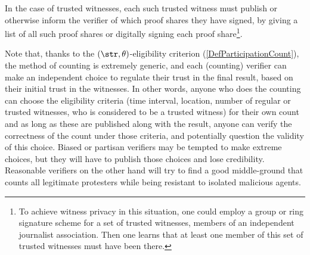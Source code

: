 

In the case of trusted witnesses, each such trusted witness must
publish or otherwise inform the verifier of which proof shares they
have signed, \eg by giving a list of all such proof shares or
digitally signing each proof share\footnote{%
  To achieve witness privacy in this situation, one could employ a
  group or ring signature scheme for a set of trusted witnesses, \eg
  members of an independent journalist association.  Then one learns
  that at least one member of this set of trusted witnesses must have
  been there.  }.

Note that, thanks to the \((\str,\theta)\)-eligibility criterion
(\cref{DefParticipationCount}), the method of counting is extremely
generic, and each (counting) verifier can make an independent choice to regulate their trust in the final result, based on their initial trust in the witnesses. In other words, anyone who does the counting can choose the eligibility
criteria (time interval, location, number of regular or trusted
witnesses, who is considered to be a trusted witness) for their own count
and as long as these are published along with the result, anyone can
verify the correctness of the count under those criteria, and potentially question the validity of this choice. Biased or partisan verifiers may be tempted to make extreme choices, but they will have to publish those choices and lose credibility. Reasonable verifiers on the other hand will try to find a good middle-ground that counts all legitimate protesters while being resistant to isolated malicious agents.

